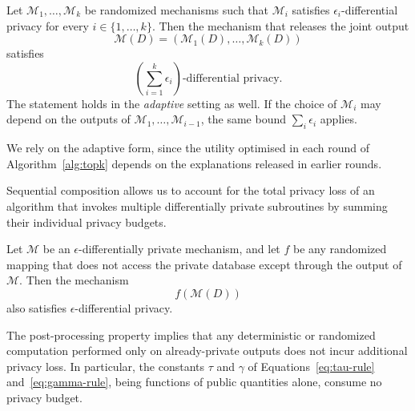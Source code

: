 \begin{theorem}
\label{thm:sequential-composition}
Let $\mathcal{M}_1,\ldots,\mathcal{M}_k$ be randomized mechanisms such that
$\mathcal{M}_i$ satisfies $\epsilon_i$-differential privacy for every
$i \in \{1,\ldots,k\}$.
Then the mechanism that releases the joint output
\[
\mathcal{M}(D)
=
\left(
\mathcal{M}_1(D),
\ldots,
\mathcal{M}_k(D)
\right)
\]
satisfies
\[
\left(\sum_{i=1}^{k}\epsilon_i\right)
\text{-differential privacy}.
\]
The statement holds in the \emph{adaptive} setting as well.
If the choice of $\mathcal{M}_i$ may depend on the outputs of $\mathcal{M}_1,\dots,\mathcal{M}_{i-1}$, the same bound $\sum_i\epsilon_i$ applies.
\end{theorem}

We rely on the adaptive form, since the utility optimised in each round of Algorithm~\ref{alg:topk} depends on the explanations released in earlier rounds.

Sequential composition allows us to account for the total privacy loss of an algorithm
that invokes multiple differentially private subroutines by summing their individual
privacy budgets.

\begin{theorem}
\label{thm:post-processing}
Let $\mathcal{M}$ be an $\epsilon$-differentially private mechanism,
and let $f$ be any randomized mapping that does not access the private database
except through the output of $\mathcal{M}$.
Then the mechanism
\[
f(\mathcal{M}(D))
\]
also satisfies $\epsilon$-differential privacy.
\end{theorem}

The post-processing property implies that any deterministic or randomized computation
performed only on already-private outputs does not incur additional privacy loss.
In particular, the constants $\tau$ and $\gamma$ of
Equations~\eqref{eq:tau-rule} and~\eqref{eq:gamma-rule}, being functions of public quantities alone,
consume no privacy budget.
